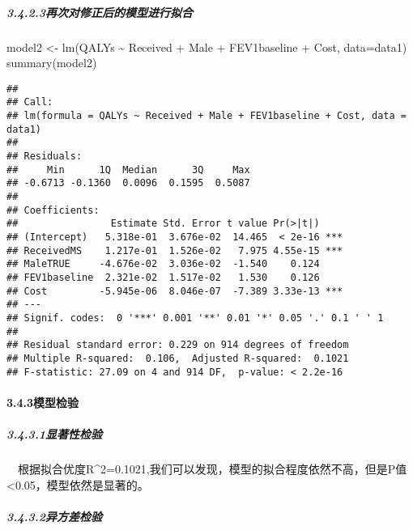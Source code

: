 \documentclass[
]{article}
\newenvironment{Shaded}{\begin{snugshade}}{\end{snugshade}}
\newcommand{\AttributeTok}[1]{\textcolor[rgb]{0.77,0.63,0.00}{#1}}
\newcommand{\FunctionTok}[1]{\textcolor[rgb]{0.00,0.00,0.00}{#1}}
\newcommand{\NormalTok}[1]{#1}
\newcommand{\OtherTok}[1]{\textcolor[rgb]{0.56,0.35,0.01}{#1}}
\newcommand{\SpecialCharTok}[1]{\textcolor[rgb]{0.00,0.00,0.00}{#1}}
\begin{document}
\hypertarget{ux518dux6b21ux5bf9ux4feeux6b63ux540eux7684ux6a21ux578bux8fdbux884cux62dfux5408}{%
\subparagraph{3.4.2.3再次对修正后的模型进行拟合}\label{ux518dux6b21ux5bf9ux4feeux6b63ux540eux7684ux6a21ux578bux8fdbux884cux62dfux5408}}

\begin{Shaded}
\begin{Highlighting}[]
\NormalTok{model2 }\OtherTok{\textless{}{-}} \FunctionTok{lm}\NormalTok{(QALYs }\SpecialCharTok{\textasciitilde{}}\NormalTok{ Received }\SpecialCharTok{+}\NormalTok{ Male }\SpecialCharTok{+}\NormalTok{ FEV1baseline }\SpecialCharTok{+}\NormalTok{ Cost, }\AttributeTok{data=}\NormalTok{data1)}
\FunctionTok{summary}\NormalTok{(model2)}
\end{Highlighting}
\end{Shaded}

\begin{verbatim}
## 
## Call:
## lm(formula = QALYs ~ Received + Male + FEV1baseline + Cost, data = data1)
## 
## Residuals:
##     Min      1Q  Median      3Q     Max 
## -0.6713 -0.1360  0.0096  0.1595  0.5087 
## 
## Coefficients:
##                Estimate Std. Error t value Pr(>|t|)    
## (Intercept)   5.318e-01  3.676e-02  14.465  < 2e-16 ***
## ReceivedMS    1.217e-01  1.526e-02   7.975 4.55e-15 ***
## MaleTRUE     -4.676e-02  3.036e-02  -1.540    0.124    
## FEV1baseline  2.321e-02  1.517e-02   1.530    0.126    
## Cost         -5.945e-06  8.046e-07  -7.389 3.33e-13 ***
## ---
## Signif. codes:  0 '***' 0.001 '**' 0.01 '*' 0.05 '.' 0.1 ' ' 1
## 
## Residual standard error: 0.229 on 914 degrees of freedom
## Multiple R-squared:  0.106,  Adjusted R-squared:  0.1021 
## F-statistic: 27.09 on 4 and 914 DF,  p-value: < 2.2e-16
\end{verbatim}

\hypertarget{ux6a21ux578bux68c0ux9a8c}{%
\paragraph{3.4.3模型检验}\label{ux6a21ux578bux68c0ux9a8c}}

\hypertarget{ux663eux8457ux6027ux68c0ux9a8c}{%
\subparagraph{3.4.3.1显著性检验}\label{ux663eux8457ux6027ux68c0ux9a8c}}

 根据拟合优度R\^{}2=0.1021,我们可以发现，模型的拟合程度依然不高，但是P值\textless0.05，模型依然是显著的。

\hypertarget{ux5f02ux65b9ux5deeux68c0ux9a8c}{%
\subparagraph{3.4.3.2异方差检验}\label{ux5f02ux65b9ux5deeux68c0ux9a8c}}
\end{document}
